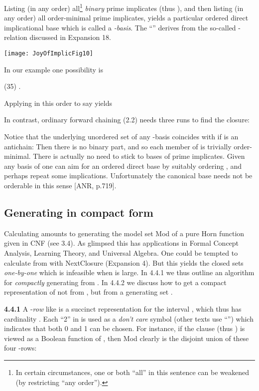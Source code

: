 \documentclass[11pt]{article}
\begin{document}
Listing (in any order) all\footnote{In certain circumstances,  one or both ``all'' in this sentence can be weakened (by restricting ``any order'').} {\it binary} prime implicates  (thus ), and then listing (in any order) all order-minimal prime implicates, yields a particular ordered direct implicational base  which is called a {\it -basis}. The ``'' derives from the so-called -relation discussed in Expansion 18.



\begin{center}
\texttt{[image: JoyOfImplicFig10]}
\end{center}


 In our example one possibility is

(35) \quad .

Applying  in this order to say  yields

In contrast, ordinary forward chaining (2.2) needs three runs to find the closure:

Notice that the underlying unordered set of any -basis  coincides with  if  is an antichain: Then there is no binary part, and so each member of  is trivially order-minimal. There is actually no need to stick to bases of prime implicates. Given any basis  of  one can aim for an ordered direct base by suitably ordering , and perhaps repeat some implications. Unfortunately the canonical base  needs not be orderable in this sense [ANR, p.719].



\subsection{Generating  in compact form}

Calculating  amounts to generating the model set Mod of a pure Horn function  given in CNF (see 3.4). As glimpsed this has applications in Formal Concept Analysis, Learning Theory, and Universal Algebra. One could be tempted to calculate  from  with NextClosure (Expansion 4). But this yields the closed sets {\it one-by-one} which is infeasible when  is large.
 In 4.4.1 we thus outline an algorithm for {\it compactly} generating  from . In 4.4.2 we discuss how to get a compact representation of  not from , but from a generating set .

{\bf 4.4.1} A -{\it row} like  is a succinct representation for the interval , which thus has cardinality . Each ``2'' in  is used as a {\it don't care} symbol (other texts use ``'') which indicates that both 0 and 1 can be chosen. For instance, if the clause  (thus ) is viewed as a Boolean function of , then Mod clearly is the disjoint union of these four -rows:
\end{document}

